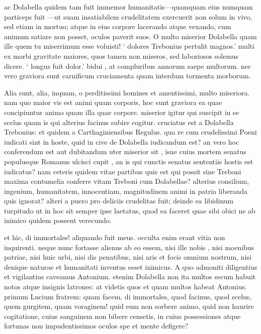  ac Dolabella quidem tam fuit immemor humanitatis—quamquam eius numquam particeps fuit —ut suam insatiabilem crudelitatem exercuerit non solum in vivo, sed etiam in mortuo; atque in eius corpore lacerando atque vexando, cum animum satiare non posset, oculos paverit suos. O multo miserior Dolabella quam ille quem tu miserrimum esse voluisti! ` dolores Trebonius pertulit magnos.' multi ex morbi gravitate maiores, quos tamen non miseros, sed laboriosos solemus dicere. ` longus fuit dolor.' bidui , at compluribus annorum saepe multorum. nec vero graviora sunt carnificum cruciamenta quam interdum tormenta morborum.

 Alia sunt, alia, inquam, o perditissimi homines et amentissimi, multo miseriora. nam quo maior vis est animi quam corporis, hoc sunt graviora ea quae concipiuntur animo quam illa quae corpore. miserior igitur qui suscipit in se scelus quam is qui alterius facinus subire cogitur. cruciatus est a Dolabella Trebonius: et quidem a Carthaginiensibus Regulus. qua re cum crudelissimi Poeni iudicati sint in hoste, quid in cive de Dolabella iudicandum est? an vero hoc conferendum est aut dubitandum uter miserior sit , isne cuius mortem senatus populusque Romanus ulcisci cupit , an is qui cunctis senatus sententiis hostis est iudicatus? nam ceteris quidem vitae partibus quis est qui possit sine Treboni maxima contumelia conferre vitam Treboni cum Dolabellae? alterius consilium, ingenium, humanitatem, innocentiam, magnitudinem animi in patria liberanda quis ignorat? alteri a puero pro deliciis crudelitas fuit; deinde ea libidinum turpitudo ut in hoc sit semper ipse laetatus, quod ea faceret quae sibi obici ne ab inimico quidem possent verecundo.

 et hic, di immortales! aliquando fuit meus. occulta enim erant vitia non inquirenti. neque nunc fortasse alienus ab eo essem, nisi ille nobis , nisi moenibus patriae, nisi huic urbi, nisi dis penatibus, nisi aris et focis omnium nostrum, nisi denique naturae et humanitati inventus esset inimicus. A quo admoniti diligentius et vigilantius caveamus Antonium. etenim Dolabella non ita multos secum habuit notos atque insignis latrones: at videtis quos et quam multos habeat Antonius. primum Lucium fratrem: quam facem, di immortales, quod facinus, quod scelus, quem gurgitem, quam voraginem! quid eum non sorbere animo, quid non haurire cogitatione, cuius sanguinem non bibere censetis, in cuius possessiones atque fortunas non impudentissimos oculos spe et mente defigere?

